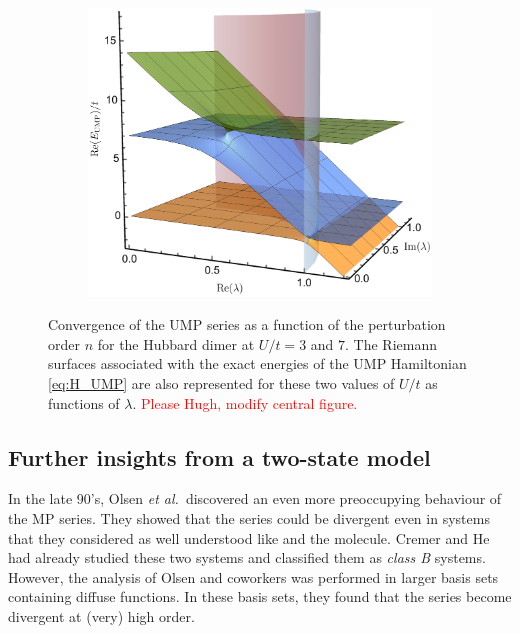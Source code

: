 \documentclass[aps,prb,reprint,noshowkeys,linenumbers,superscriptaddress]{revtex4-1}
\newcommand{\titou}[1]{\textcolor{red}{#1}}
\begin{document}
\begin{figure}
\begin{subfigure}{0.32\textwidth}
	\includegraphics[height=0.75\textwidth]{fig3c}	
    \end{subfigure}	\caption{
	Convergence of the UMP series as a function of the perturbation order $n$ for the Hubbard dimer at $U/t = 3$ and $7$.
	The Riemann surfaces associated with the exact energies of the UMP Hamiltonian \eqref{eq:H_UMP} are also represented for these two values of $U/t$ as functions of $\lambda$. \titou{Please Hugh, modify central figure.}
	\label{fig:UMP}}
\end{figure}


\subsection{Further insights from a two-state model}

In the late 90's, Olsen \textit{et al.}~discovered an even more preoccupying behaviour of the MP series. \cite{Olsen_1996} 
They showed that the series could be divergent even in systems that they considered as well understood like  and the  molecule. \cite{Olsen_1996, Christiansen_1996} 
Cremer and He had already studied these two systems and classified them as \textit{class B} systems. 
However, the analysis of Olsen and coworkers was performed in larger basis sets containing diffuse functions. 
In these basis sets, they found that the series become divergent at (very) high order.
\end{document}
